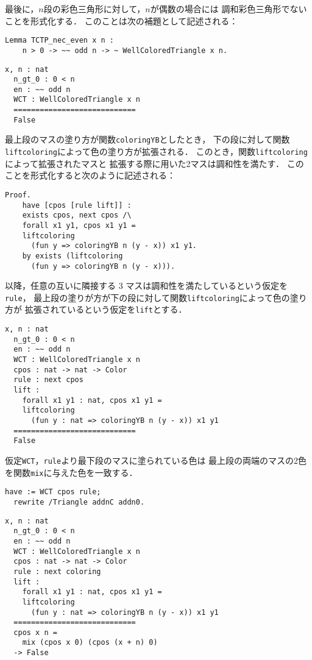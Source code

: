 最後に，$n$段の彩色三角形に対して，$n$が偶数の場合には
調和彩色三角形でないことを形式化する．
このことは次の補題として記述される：
\begin{lstlisting}[language=Coq]
  Lemma TCTP_nec_even x n :
    n > 0 -> ~~ odd n -> ~ WellColoredTriangle x n.
\end{lstlisting}
\begin{lstlisting}[language=Coq]
  x, n : nat
  n_gt_0 : 0 < n
  en : ~~ odd n
  WCT : WellColoredTriangle x n
  ============================
  False
\end{lstlisting}
最上段のマスの塗り方が関数{\tt{coloringYB}}としたとき，
下の段に対して関数{\tt{liftcoloring}}によって色の塗り方が拡張される．
このとき，関数{\tt{liftcoloring}}によって拡張されたマスと
拡張する際に用いた2マスは調和性を満たす．
このことを形式化すると次のように記述される：
\begin{lstlisting}[language=Coq]
  Proof.
    have [cpos [rule lift]] :
    exists cpos, next cpos /\
    forall x1 y1, cpos x1 y1 =
    liftcoloring
      (fun y => coloringYB n (y - x)) x1 y1.
    by exists (liftcoloring
      (fun y => coloringYB n (y - x))).
\end{lstlisting}
以降，任意の互いに隣接する 3 マスは調和性を満たしているという仮定を{\tt{rule}}，
最上段の塗りが方が下の段に対して関数{\tt{liftcoloring}}によって色の塗り方が
拡張されているという仮定を{\tt{lift}}とする．
\begin{lstlisting}[language=Coq]
  x, n : nat
  n_gt_0 : 0 < n
  en : ~~ odd n
  WCT : WellColoredTriangle x n
  cpos : nat -> nat -> Color
  rule : next cpos
  lift :
    forall x1 y1 : nat, cpos x1 y1 =
    liftcoloring
      (fun y : nat => coloringYB n (y - x)) x1 y1
  ============================
  False
\end{lstlisting}
仮定{\tt{WCT}}，{\tt{rule}}より最下段のマスに塗られている色は
最上段の両端のマスの2色を関数{\tt{mix}}に与えた色を一致する．
\begin{lstlisting}[language=Coq]
  have := WCT cpos rule;
  rewrite /Triangle addnC addn0.
\end{lstlisting}
\begin{lstlisting}[language=Coq]
  x, n : nat
  n_gt_0 : 0 < n
  en : ~~ odd n
  WCT : WellColoredTriangle x n
  cpos : nat -> nat -> Color
  rule : next coloring
  lift :
    forall x1 y1 : nat, cpos x1 y1 =
    liftcoloring
      (fun y : nat => coloringYB n (y - x)) x1 y1
  ============================
  cpos x n =
    mix (cpos x 0) (cpos (x + n) 0)
  -> False
\end{lstlisting}
